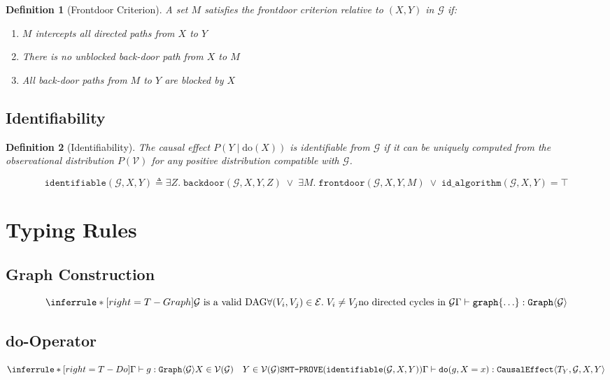 \documentclass[11pt]{article}
\newtheorem{definition}{Definition}
\begin{document}
\begin{definition}[Frontdoor Criterion]
A set $M$ satisfies the frontdoor criterion relative to $(X, Y)$ in $\mathcal{G}$ if:
\begin{enumerate}
\item $M$ intercepts all directed paths from $X$ to $Y$
\item There is no unblocked back-door path from $X$ to $M$
\item All back-door paths from $M$ to $Y$ are blocked by $X$
\end{enumerate}
\end{definition}

\subsection{Identifiability}
\begin{definition}[Identifiability]
The causal effect $P(Y \mid \text{do}(X))$ is \emph{identifiable} from $\mathcal{G}$ if it can be uniquely computed from the observational distribution $P(\mathcal{V})$ for any positive distribution compatible with $\mathcal{G}$.
\end{definition}

\[
\texttt{identifiable}(\mathcal{G}, X, Y) \triangleq
\exists Z.\; \texttt{backdoor}(\mathcal{G}, X, Y, Z) \;\lor\;
\exists M.\; \texttt{frontdoor}(\mathcal{G}, X, Y, M) \;\lor\;
\texttt{id\_algorithm}(\mathcal{G}, X, Y) = \top
\]

\section{Typing Rules}

\subsection{Graph Construction}
\[
\inferrule*[right=T-Graph]
  {\mathcal{G} \text{ is a valid DAG} \\
   \forall (V_i, V_j) \in \mathcal{E}.\; V_i \neq V_j \\
   \text{no directed cycles in } \mathcal{G}}
  {\Gamma \vdash \texttt{graph}\{\ldots\} : \texttt{Graph}\langle \mathcal{G} \rangle}
\]

\subsection{do-Operator}
\[
\inferrule*[right=T-Do]
  {\Gamma \vdash g : \texttt{Graph}\langle \mathcal{G} \rangle \\
   X \in \mathcal{V}(\mathcal{G}) \quad Y \in \mathcal{V}(\mathcal{G}) \\
   \texttt{SMT-PROVE}(\texttt{identifiable}(\mathcal{G}, X, Y))}
  {\Gamma \vdash \texttt{do}(g, X = x) : \texttt{CausalEffect}\langle T_Y, \mathcal{G}, X, Y \rangle}
\]
\end{document}
